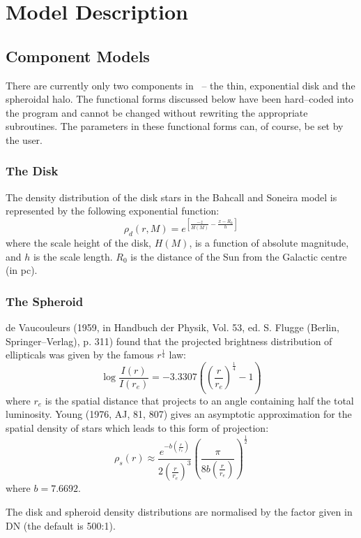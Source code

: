 \documentclass[11pt,twoside]{article}
\begin{document}
\newpage
\section{Model Description}

\subsection{Component Models}

There are currently only two components in \bsm\ -- the thin, exponential
disk and the spheroidal halo. The functional forms discussed below have been
hard--coded into the program and cannot be changed without rewriting the
appropriate subroutines. The parameters in these functional forms can,
of course, be set by the user.

\subsubsection*{The Disk}

The density  distribution of  the disk stars in the Bahcall and  Soneira
model is represented by the following exponential function:
\[ 
\rho_d(r,M) = e^{\left[\frac{-z}{H(M)} - \frac{x-R_0}{h} \right]}
\] 
where the  scale height of the disk,  $H(M)$, is a  function  of  absolute
magnitude, and $h$ is the scale length. $R_0$ is the distance of the Sun from
the Galactic centre (in pc).
 
\subsubsection*{The Spheroid}

de Vaucouleurs (1959,  in  Handbuch  der Physik, Vol. 53,  ed. S. Flugge
(Berlin, Springer--Verlag), p. 311) found  that the projected  brightness
distribution of ellipticals was given by the famous $r^\frac{1}{4}$ law:
\[
\log \frac{I(r)}{I(r_e)} = -3.3307 \left( \left(\frac{r}{r_e}\right)^
{\frac{1}{4}} - 1 \right)
\]
where  $r_e$  is the spatial distance that  projects to an angle containing
half the total luminosity. Young (1976, AJ, 81, 807) gives an asymptotic
approximation for the spatial density of stars  which leads to this form
of projection:
\[
\rho_s(r) \approx \frac{e^{-b\left(\frac{r}{r_e}\right)}}
{2\left(\frac{r}{r_e}\right)^3}
\left( \frac{\pi}{8 b \left(\frac{r}{r_e}\right)} \right)^{\frac{1}{2}}
\]
where $b = 7.6692$.

The disk and spheroid density distributions are normalised by the factor
given in DN (the default is 500:1).
\end{document}
